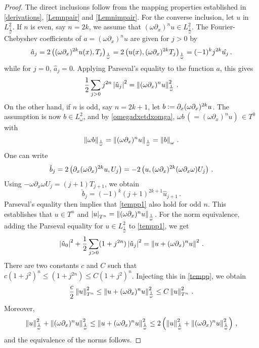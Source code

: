 \documentclass[a4paper]{article}
\begin{document}
\begin{proof}
	The direct inclusions follow from the mapping properties established in \autoref{derivations}, \autoref{Lemnpair} and \autoref{Lemnimpair}. 
	For the converse inclusion, let $u$ in $L^2_\frac{1}{\omega}$. If $n$ is even, say $n=2k$, we assume that $(\omega \partial_x)^{n}u \in L^2_\frac{1}{\omega}$. The Fourier-Chebyshev coefficients of $a = (\omega \partial_x)^n u$ are given for $j > 0$ by
	\[\hat{a}_j = 2\left( (\omega \partial_x)^{2k} u(x),T_j\right)_\frac{1}{\omega} =  2\left(  u(x),(\omega \partial_x)^{2k}T_j\right)_\frac{1}{\omega} = (-1)^k j^{2k} \hat{u_j}\,.\]
	while for $j = 0$, $\hat{a}_j = 0$. 
	Applying Parseval's equality to the function $a$, this gives
	\begin{equation}
	\label{tempp1}
		\frac{1}{2}\sum_{j > 0} j^{2n} \left\lvert \hat{u}_j \right\rvert^2 = \left\|(\omega \partial_x)^n u\right\|_\frac{1}{\omega}^2\,.
	\end{equation}
	On the other hand, if $n$ is odd, say $n = 2k+1$, let $b \mathrel{\mathop:}= \partial_x (\omega \partial_x)^{2k} u$. The assumption is now $b \in L^2_\omega$, and by \autoref{omegadxetdxomga}, $\omega b \, ( = (\omega \partial_x)^n u) \, \in T^0$ with
	\[\left\|\omega b\right\|_{\frac{1}{\omega}} = \left\|(\omega \partial_x)^n u\right\|_{\frac{1}{\omega}} =  \left\|b\right\|_\omega\,.\]
	One can write
	\[\check{b}_j = 2\left( \partial_x(\omega \partial_x)^{2k} u,U_j\right) = -2 \left( u,(\omega \partial_x)^{2k}(\omega \partial_x \omega) U_j\right)\,.\]
	Using $-\omega \partial_x \omega U_j = (j+1)T_{j+1}$, we obtain
	\[\check{b}_j = (-1)^k(j+1)^{2k + 1} \hat{u}_{j+1}\,.\]
	Parseval's equality then implies that \eqref{tempp1} also hold for odd $n$.
	This establishes that $u \in T^n$ and $\left\lvert u \right\rvert_{T^n} = \left\|(\omega \partial_x)^nu\right\|_\frac{1}{\omega}$. For the norm equivalence, adding the Parseval equality for $u \in L^2_\frac{1}{\omega}$ to \cref{tempp1}, we get 
	\begin{equation}
		\left\lvert \hat{u}_0 \right\rvert^2 + \frac{1}{2}\sum_{j > 0}  (1 + j^{2n}) \left\lvert \hat{u}_j \right\rvert^2 = \left\|u + (\omega \partial_x)^n u\right\|^2\,.
		\label{tempp}
	\end{equation}
	There are two constants $c$ and $C$ such that $c (1 + j^2)^n \leq (1 + j^{2n}) \leq C(1 + j^2)^n$. Injecting this in \eqref{tempp}, we obtain
	\[ \frac{c}{2}\left\|u\right\|_{T^n}^2 \leq \left\|u + (\omega \partial_x)^n u\right\|^2_\frac{1}{\omega} \leq C\left\|u\right\|_{T^n}^2\,.\]
	Moreover,
	\[\left\|u\right\|^2_\frac{1}{\omega} + \left\|(\omega \partial_x)^n u\right\|_\frac{1}{\omega}^2\leq \left\|u + (\omega \partial_x)^n u\right\|^2_\frac{1}{\omega} \leq 2\left(\left\|u\right\|^2_\frac{1}{\omega} + \left\|(\omega \partial_x)^n u\right\|_\frac{1}{\omega}^2\right)\,,\] 
	and the equivalence of the norms follows.
\end{proof}
\end{document}
